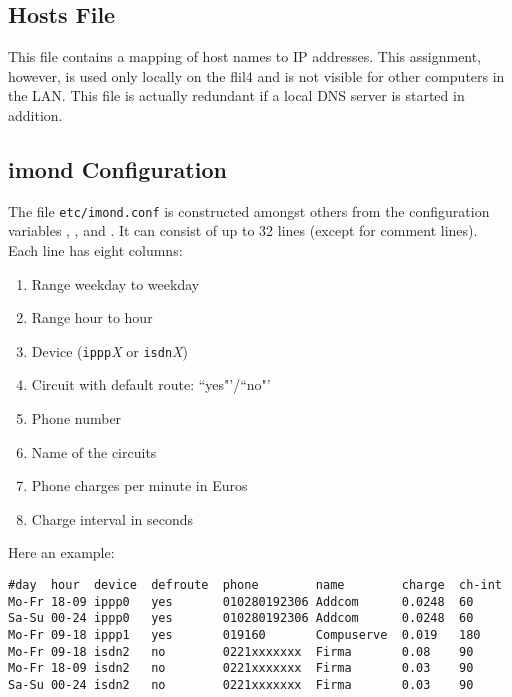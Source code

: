 \subsection{Hosts File}

    This file contains a mapping of host names to IP addresses. This
    assignment, however, is used only locally on the flil4 and is not visible
    for other computers in the LAN. This file is actually redundant if
    a local DNS server is started in addition.


\subsection{imond Configuration}

The file \texttt{etc/imond.conf} is constructed amongst others from the configuration variables
, , 
and . It can consist of up to 32 lines
(except for comment lines). Each line has eight columns:

\begin{enumerate}
\item  Range weekday to weekday
\item  Range hour to hour
\item  Device (\texttt{ippp}\emph{X} or \texttt{isdn}\emph{X})
\item  Circuit with default route: ``yes"'/``no"'
\item  Phone number
\item  Name of the circuits
\item  Phone charges per minute in Euros
\item  Charge interval in seconds
\end{enumerate}

    Here an example:

\begin{example}
\begin{verbatim}
#day  hour  device  defroute  phone        name        charge  ch-int
Mo-Fr 18-09 ippp0   yes       010280192306 Addcom      0.0248  60
Sa-Su 00-24 ippp0   yes       010280192306 Addcom      0.0248  60
Mo-Fr 09-18 ippp1   yes       019160       Compuserve  0.019   180
Mo-Fr 09-18 isdn2   no        0221xxxxxxx  Firma       0.08    90
Mo-Fr 18-09 isdn2   no        0221xxxxxxx  Firma       0.03    90
Sa-Su 00-24 isdn2   no        0221xxxxxxx  Firma       0.03    90
\end{verbatim}
\end{example}

